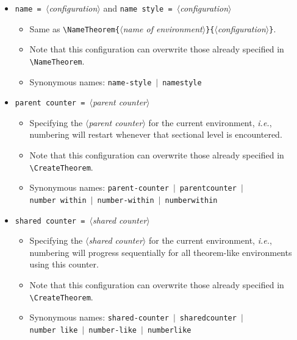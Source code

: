 \documentclass[classical]{einfart}
\newcommand{\meta}[1]{$\langle${\normalfont\itshape#1}$\rangle$}
\newcommand{\commandoption}[1]{\texttt{\textcolor{code-keys}{#1}}}
\begin{document}
\begin{itemize}[label=,leftmargin=1.25em,itemindent=-1.25em]
    \item \commandoption{name}\lstinline| = |\meta{configuration} and \commandoption{name style}\lstinline| = |\meta{configuration}
        \begin{itemize}
            \item Same as \lstinline|\NameTheorem{|\meta{name of environment}\lstinline|}{|\meta{configuration}\lstinline|}|.
            \item Note that this configuration can overwrite those already specified in \lstinline|\NameTheorem|.
            \item Synonymous names: \commandoption{name-style} \,$|$\, \commandoption{namestyle}
        \end{itemize}
    \item \commandoption{parent counter}\lstinline| = |\meta{parent counter}
        \begin{itemize}
            \item Specifying the \meta{parent counter} for the current environment, \emph{i.e.}, numbering will restart whenever that sectional level is encountered.
            \item Note that this configuration can overwrite those already specified in \lstinline|\CreateTheorem|.
            \item Synonymous names: \commandoption{parent-counter} \,$|$\, \commandoption{parentcounter} \,$|$\, \\\phantom{Synonymous names: }\commandoption{number within} \,$|$\, \commandoption{number-within} \,$|$\, \commandoption{numberwithin}
        \end{itemize}
    \item \commandoption{shared counter}\lstinline| = |\meta{shared counter}
        \begin{itemize}
            \item Specifying the \meta{shared counter} for the current environment, \emph{i.e.}, numbering will progress sequentially for all theorem-like environments using this counter.
            \item Note that this configuration can overwrite those already specified in \lstinline|\CreateTheorem|.
            \item Synonymous names: \commandoption{shared-counter} \,$|$\, \commandoption{sharedcounter} \,$|$\, \\\phantom{Synonymous names: }\commandoption{number like} \,$|$\, \commandoption{number-like} \,$|$\, \commandoption{numberlike}
        \end{itemize}
\end{itemize}
\end{document}

